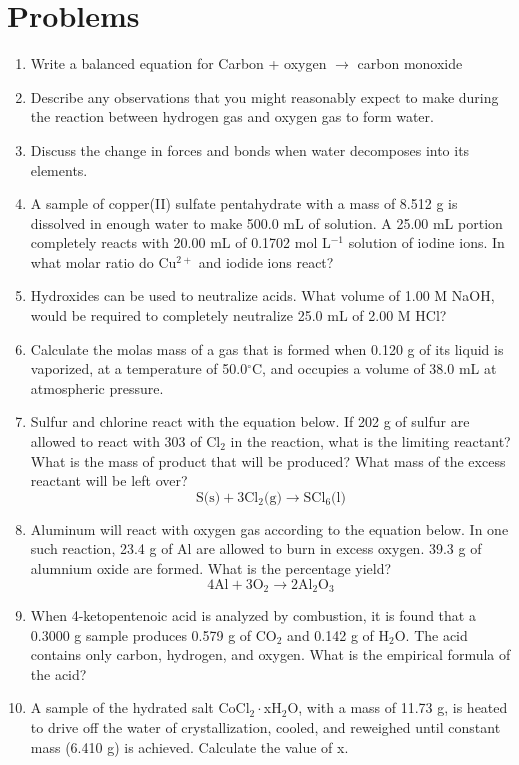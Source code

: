 \documentclass[../chem.tex]{subfiles}
\begin{document}
\section*{Problems}
\begin{enumerate}
    \item Write a balanced equation for Carbon + oxygen $\rightarrow$ carbon monoxide
    \item Describe any observations that you might reasonably expect to make during the reaction between hydrogen gas and oxygen gas to form water.
    \item Discuss the change in forces and bonds when water decomposes into its elements.
    \item A sample of copper(II) sulfate pentahydrate with a mass of 8.512 g is dissolved in enough water to make 500.0 mL of solution. A 25.00 mL portion completely reacts with 20.00 mL of 0.1702 mol L$^{-1}$ solution of iodine ions. In what molar ratio do Cu$^{2+}$ and iodide ions react?
    \item Hydroxides can be used to neutralize acids. What volume of 1.00 M NaOH, would be required to completely neutralize 25.0 mL of 2.00 M HCl?
    \item Calculate the molas mass of a gas that is formed when 0.120 g of its liquid is vaporized, at a temperature of 50.0$^{\circ}$C, and occupies a volume of 38.0 mL at atmospheric pressure.
    \item Sulfur and chlorine react with the equation below. If 202 g of sulfur are allowed to react with 303 of Cl$_2$ in the reaction, what is the limiting reactant? What is the mass of product that will be produced? What mass of the excess reactant will be left over?
    \[\text{S(s)}+3\text{Cl}_2\text{(g)}\rightarrow \text{SCl}_6\text{(l)}\] 
    \item Aluminum will react with oxygen gas according to the equation below. In one such reaction, 23.4 g of Al are allowed to burn in excess oxygen. 39.3 g of alumnium oxide are formed. What is the percentage yield?
    \[4\text{Al}+3\text{O}_2\rightarrow 2\text{Al}_2\text{O}_3\]
    \item When 4-ketopentenoic acid is analyzed by combustion, it is found that a 0.3000 g sample produces 0.579 g of CO$_2$ and 0.142 g of H$_2$O. The acid contains only carbon, hydrogen, and oxygen. What is the empirical formula of the acid?
    \item A sample of the hydrated salt CoCl$_2\cdot$xH$_2$O, with a mass of 11.73 g, is heated to drive off the water of crystallization, cooled, and reweighed until constant mass (6.410 g) is achieved. Calculate the value of x.

\end{enumerate}
\end{document}
